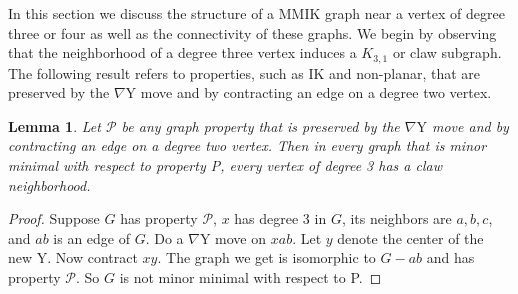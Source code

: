 \documentclass{amsart}
\newtheorem{lemma}[theorem]{Lemma}
\theoremstyle{remark}
\newcommand{\R}{\mathbb R}
\newcommand{\ty}{\nabla\mathrm{Y}}
\newcommand{\PP}{\mathcal P}
\begin{document}
{%



In this section we discuss the structure of a MMIK graph near a vertex of degree three or four as well as the connectivity of these graphs.
We begin by observing that the neighborhood of a degree three vertex induces a $K_{3,1}$ or claw subgraph.
The following result refers to properties, such as IK and non-planar,
that are preserved by the $\ty$ move and by contracting an edge on a degree two vertex.

\begin{lemma}
\label{lem-mmikclaw}
Let $\PP$ be any graph property that is preserved by the $\ty$ move
and by contracting an edge on a degree two vertex.
Then in every graph that is minor minimal with respect to property P,
every vertex of degree 3 has a claw neighborhood.
\end{lemma}
\begin{proof}
Suppose $G$ has property $\PP$,
$x$ has degree 3 in $G$,
its neighbors are $a, b, c$,
and $ab$ is an edge of $G$.
Do a $\ty$ move on $xab$.
Let $y$ denote the center of the new Y.
Now contract $xy$.
The graph we get is isomorphic to $G - ab$
and has property $\PP$.
So $G$ is not minor minimal with respect to P.
\end{proof}

}
\end{document}
